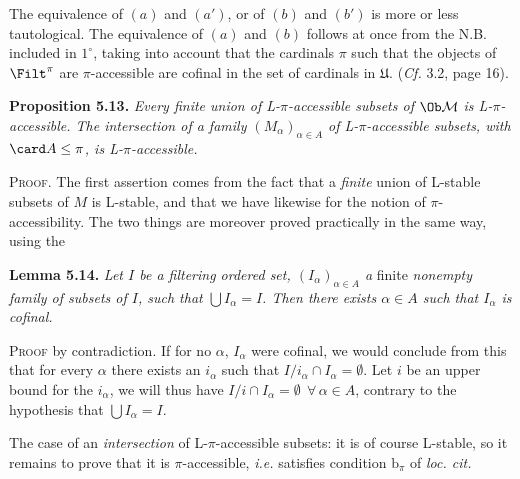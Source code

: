 
The equivalence of $(a)$ and $(a')$, or of $(b)$ and $(b')$ is more or less tautological. The equivalence of $(a)$ and $(b)$ follows at once from the N.B. included in $1^{\circ}$, taking into account that the cardinals $\pi$ such that the objects of $\Filt^{\pi}$ are $\pi$-accessible are cofinal in the set of cardinals in $\mathfrak{U}$. (\textit{Cf.} 3.2, page 16).

\textbf{Proposition 5.13.} \textit{Every finite union of L-$\pi$-accessible subsets of} $\Ob\mathcal{M}$ \textit{is L-$\pi$-accessible. The intersection of a family $(M_{\alpha})_{\alpha\in A}$ of L-$\pi$-accessible subsets, with} $\card A \leq \pi$\textit{, is L-$\pi$-accessible.}

\textsc{Proof}. The first assertion comes from the fact that a \textit{finite} union of L-stable subsets of $M$ is L-stable, and that we have likewise for the notion of $\pi$-accessibility. The two things are moreover proved practically in the same way, using the

\textbf{Lemma 5.14.} \textit{Let $I$ be a filtering ordered set, $(I_{\alpha})_{\alpha\in A}$ a} finite \textit{nonempty family of subsets of $I$, such that $\bigcup I_{\alpha} = I$. Then there exists $\alpha \in A$ such that $I_{\alpha}$ is cofinal.}

\textsc{Proof} by contradiction. If for no $\alpha$, $I_{\alpha}$ were cofinal, we would conclude from this that for every $\alpha$ there exists an $i_{\alpha}$ such that $I/i_{\alpha} \cap I_{\alpha} = \emptyset$. Let $i$ be an upper bound for the $i_{\alpha}$, we will thus have $I/i \cap I_{\alpha} = \emptyset \ \ \forall\, \alpha \in A$, contrary to the hypothesis that $\bigcup I_{\alpha} = I$.

The case of an \textit{intersection} of L-$\pi$-accessible subsets: it is of course L-stable, so it remains to prove that it is $\pi$-accessible, \textit{i.e.} satisfies condition $\mathrm{b}_{\pi}$ of \textit{loc. cit.}

